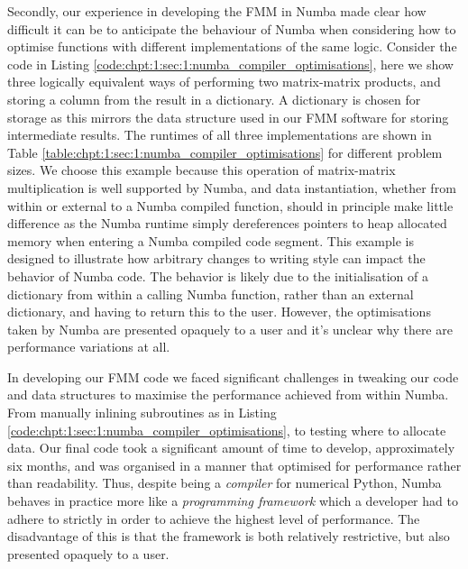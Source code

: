 Secondly, our experience in developing the FMM in Numba made clear how difficult it can be to anticipate the behaviour of Numba when considering how to optimise functions with different implementations of the same logic. Consider the code in Listing \ref{code:chpt:1:sec:1:numba_compiler_optimisations}, here we show three logically equivalent ways of performing two matrix-matrix products, and storing a column from the result in a dictionary. A dictionary is chosen for storage as this mirrors the data structure used in our FMM software for storing intermediate results. The runtimes of all three implementations are shown in Table \ref{table:chpt:1:sec:1:numba_compiler_optimisations} for different problem sizes. We choose this example because this operation of matrix-matrix multiplication is well supported by Numba, and data instantiation, whether from within or external to a Numba compiled function, should in principle make little difference as the Numba runtime simply dereferences pointers to heap allocated memory when entering a Numba compiled code segment. This example is designed to illustrate how arbitrary changes to writing style can impact the behavior of Numba code. The behavior is likely due to the initialisation of a dictionary from within a calling Numba function, rather than an external dictionary, and having to return this to the user. However, the optimisations taken by Numba are presented opaquely to a user and it's unclear why there are performance variations at all.

In developing our FMM code we faced significant challenges in tweaking our code and data structures to maximise the performance achieved from within Numba. From manually inlining subroutines as in Listing \ref{code:chpt:1:sec:1:numba_compiler_optimisations}, to testing where to allocate data. Our final code took a significant amount of time to develop, approximately six months, and was organised in a manner that optimised for performance rather than readability. Thus, despite being a \textit{compiler} for numerical Python, Numba behaves in practice more like a \textit{programming framework} which a developer had to adhere to strictly in order to achieve the highest level of performance. The disadvantage of this is that the framework is both relatively restrictive, but also presented opaquely to a user.

